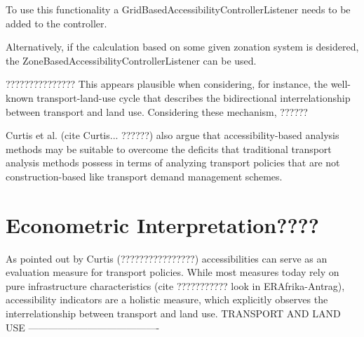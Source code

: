 To use this functionality a GridBasedAccessibilityControllerListener needs to be added to the controller.

Alternatively, if the calculation based on some given zonation system is desidered, the ZoneBasedAccessibilityControllerListener can be used.





???????????????
This appears plausible when considering, for instance, the well-known transport-land-use cycle that describes the 
bidirectional interrelationship between transport and land use. Considering these mechanism, ?????? 

Curtis et al. (cite Curtis... ??????) also argue that accessibility-based analysis methods may be suitable to overcome 
the deficits that traditional transport analysis methods possess in terms of analyzing transport policies that are not 
construction-based like transport demand management schemes.





\section{Econometric Interpretation????}

As pointed out by Curtis (????????????????) accessibilities can serve as an evaluation measure for transport 
policies. While most measures today rely on pure infrastructure characteristics (cite ??????????? look in ERAfrika-Antrag), 
accessibility indicators are a holistic measure, which explicitly observes the interrelationship between transport and land use.
TRANSPORT AND LAND USE ----------------------------------------

